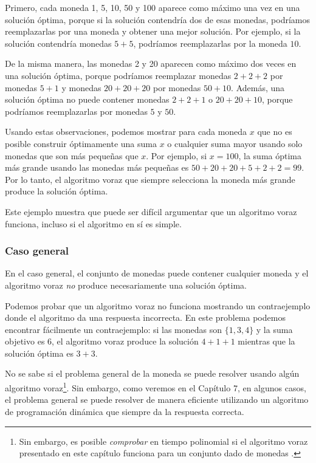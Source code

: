 Primero, cada moneda 1, 5, 10, 50 y 100 aparece
como máximo una vez en una solución óptima,
porque si la
solución contendría dos de esas monedas,
podríamos reemplazarlas por una moneda y
obtener una mejor solución.
Por ejemplo, si la solución contendría
monedas $5+5$, podríamos reemplazarlas por la moneda $10$.

De la misma manera, las monedas 2 y 20 aparecen
como máximo dos veces en una solución óptima,
porque podríamos reemplazar
monedas $2+2+2$ por monedas $5+1$ y
monedas $20+20+20$ por monedas $50+10$.
Además, una solución óptima no puede contener
monedas $2+2+1$ o $20+20+10$,
porque podríamos reemplazarlas por monedas $5$ y $50$.

Usando estas observaciones,
podemos mostrar para cada moneda $x$ que
no es posible construir óptimamente
una suma $x$ o cualquier suma mayor usando solo monedas
que son más pequeñas que $x$.
Por ejemplo, si $x=100$, la suma óptima más grande
usando las monedas más pequeñas es  $50+20+20+5+2+2=99$.
Por lo tanto, el algoritmo voraz que siempre selecciona
la moneda más grande produce la solución óptima.

Este ejemplo muestra que puede ser difícil
argumentar que un algoritmo voraz funciona,
incluso si el algoritmo en sí es simple.

\subsubsection{Caso general}

En el caso general, el conjunto de monedas puede contener cualquier moneda
y el algoritmo voraz \emph{no} produce necesariamente
una solución óptima.

Podemos probar que un algoritmo voraz no funciona
mostrando un contraejemplo
donde el algoritmo da una respuesta incorrecta.
En este problema podemos encontrar fácilmente un contraejemplo:
si las monedas son $\{1,3,4\}$ y la suma objetivo
es 6, el algoritmo voraz produce la solución
$4+1+1$ mientras que la solución óptima es $3+3$.

No se sabe si el problema general de la moneda
se puede resolver usando algún algoritmo voraz\footnote{Sin embargo, es posible
\emph{comprobar} en tiempo polinomial
si el algoritmo voraz presentado en este capítulo funciona para
un conjunto dado de monedas \cite{pea05}.}.
Sin embargo, como veremos en el Capítulo 7,
en algunos casos,
el problema general se puede resolver de manera eficiente
utilizando un algoritmo de programación dinámica que siempre da la
respuesta correcta.

